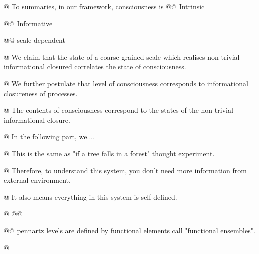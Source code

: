 \begin{WritingMaterials}
        @ To summaries, in our framework, consciousness is 
			    @@ Intrinsic 
			    
			    @@ Informative  
			    
				@@ scale-dependent 

			@ We claim that the state of a coarse-grained scale which realises non-trivial informational closured correlates the state of consciousness.

			@ We further postulate that level of consciousness corresponds to informational closureness of processes.

			@ The contents of consciousness correspond to the states of the non-trivial informational closure.

				
			@ In the following part, we....


			@ This is the same as "if a tree falls in a forest" thought experiment.

			@ Therefore, to understand this system, you don't need more information from external environment.

			@ It also means everything in this system is self-defined.
			
			
			@ 
				@@ 

				@@ pennartz levels are defined by functional elements call "functional ensembles". \cite{pennartz2017consciousness} 

			@  \cite{pennartz2017consciousness}
                

\end{WritingMaterials}
